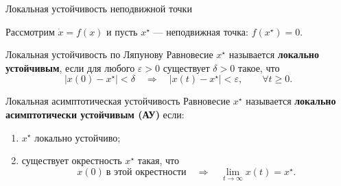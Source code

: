\documentclass{beamer}
\begin{document}
	
	
	
	\begin{frame}{Локальная устойчивость неподвижной точки}
		\begin{flushleft}
			{\small
			Рассмотрим \(\dot{x}=f(x)\) и пусть \(x^\star\) — неподвижная точка: \(f(x^\star)=0\).
			
			\begin{block}{Локальная устойчивость по Ляпунову}
				Равновесие \(x^\star\) называется \textbf{локально устойчивым}, если для любого
				\(\varepsilon>0\) существует \(\delta>0\) такое, что
				\[
				|x(0)-x^\star|<\delta
				\quad\Longrightarrow\quad
				|x(t)-x^\star|<\varepsilon,
				\qquad \forall t\geq 0.
				\]
			\end{block}
			
			\vspace{0.2cm}
			
			\begin{block}{Локальная асимптотическая устойчивость}
				Равновесие \(x^\star\) называется \textbf{локально асимптотически устойчивым (АУ)}
				если:
				
				\begin{enumerate}
					\item \(x^\star\) локально устойчиво;
					\item существует окрестность \(x^\star\) такая, что
					\[
					x(0)\ \text{в этой окрестности}
					\quad\Longrightarrow\quad
					\lim_{t\to\infty}x(t)=x^\star.
					\]
				\end{enumerate}
			\end{block}
		
		}
			
		\end{flushleft}
	\end{frame}
	
	
	
\end{document}
